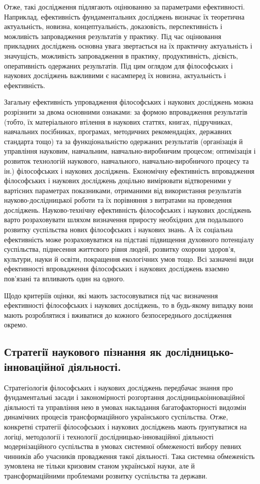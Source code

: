 Отже, такі дослідження підлягають оцінюванню за параметрами
ефективності. Наприклад, ефективність фундаментальних досліджень визначає
їх теоретична актуальність, новизна, концептуальність, доказовість,
перспективність і можливість запровадження результатів у практику. Під час
оцінювання прикладних досліджень основна увага звертається на їх практичну
актуальність і значущість, можливість запровадження в практику,
продуктивність, дієвість, оперативність одержаних результатів. Під цим
оглядом для філософських і наукових досліджень важливими є насамперед їх
новизна, актуальність і ефективність.

Загальну ефективність упровадження філософських і наукових досліджень
можна розрізнити за двома основними ознаками: за формою впровадження
результатів (тобто, їх матеріального втілення в наукових статтях, книгах,
підручниках, навчальних посібниках, програмах, методичних рекомендаціях,
державних стандарта тощо) та за функціональністю одержаних результатів
(організація й управління науковим, навчальним, навчально-виробничим
процесом; оптимізація і розвиток технологій наукового, навчального,
навчально-виробничого процесу та ін.) філософських і наукових досліджень.
Економічну ефективність впровадження філософських і наукових досліджень
доцільно вимірювати відтвореними у вартісних параметрах показниками,
отриманими від використання результатів науково-дослідницької роботи та їх
порівняння з витратами на проведення досліджень. Науково-технічну
ефективність філософських і наукових досліджень варто розраховувати шляхом
визначення приросту необхідних для подальшого розвитку суспільства нових
філософських і наукових знань. А їх соціальна ефективність може
розраховуватися на підставі підвищення духовного потенціалу суспільства,
піднесення життєвого рівня людей, розвитку охорони здоров’я, культури, науки
й освіти, покращення екологічних умов тощо. Всі зазначені види ефективності
впровадження філософських і наукових досліджень взаємно пов’язані та
впливають один на одного.

Щодо критеріїв оцінки, які мають застосовуватися під час визначення
ефективності філософських і наукових досліджень, то в будь-якому випадку
вони мають розроблятися і вживатися до кожного безпосереднього
дослідження окремо.

\subsection{Стратегії наукового пізнання як дослідницько-інновацій\-ної діяльності.}
Стратегіологія філософських і наукових досліджень передбачає
знання про фундаментальні засади і закономірності розгортання
дослідницькоінноваційної діяльності та управління нею в умовах накладання
багатофакторності видозмін динамічних процесів трансформаційного
українського суспільства. Отже, конкретні стратегії філософських і наукових
досліджень мають ґрунтуватися на логіці, методології і технології
дослідницько-інноваційної діяльності модернізаційного суспільства в умовах
системної обмеженості вибору певних чинників або учасників провадження
такої діяльності. Така системна обмеженість зумовлена не тільки кризовим
станом української науки, але й трансформаційними проблемами розвитку
суспільства та держави.

